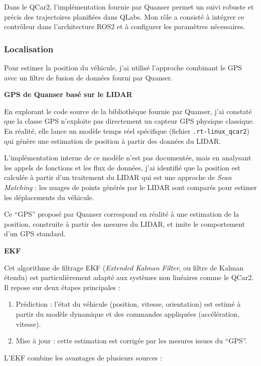 \documentclass{name}
\begin{document}
Dans le QCar2, l'implémentation fournie par Quanser permet un suivi robuste et précis des trajectoires planifiées dans QLabs. Mon rôle a consisté à intégrer ce contrôleur dans l'architecture ROS2 et à configurer les paramètres nécessaires.

\subsubsection*{Localisation}

Pour estimer la position du véhicule, j'ai utilisé l'approche combinant le GPS avec un filtre de fusion de données fourni par Quanser.

\textbf{GPS de Quanser basé sur le LIDAR}

En explorant le code source de la bibliothèque fournie par Quanser, j'ai constaté que la classe GPS n'exploite pas directement un capteur GPS physique classique. En réalité, elle lance un modèle temps réel spécifique (fichier \texttt{.rt-linux\_qcar2}) qui génère une estimation de position à partir des données du LIDAR.

L'implémentation interne de ce modèle n'est pas documentée, mais en analysant les appels de fonctions et les flux de données, j'ai identifié que la position est calculée à partir d'un traitement du LIDAR qui est une approche de \textit{Scan Matching} : les nuages de points générés par le LIDAR sont comparés pour estimer les déplacements du véhicule.

Ce “GPS” proposé par Quanser correspond en réalité à une estimation de la position, construite à partir des mesures du LIDAR, et imite le comportement d'un GPS standard.

\textbf{EKF}

Cet algorithme de filtrage EKF (\textit{Extended Kalman Filter}, ou filtre de Kalman étendu) est particulièrement adapté aux systèmes non linéaires comme le QCar2. Il repose sur deux étapes principales :

\begin{enumerate}
    \item Prédiction : l'état du véhicule (position, vitesse, orientation) est estimé à partir du modèle dynamique et des commandes appliquées (accélération, vitesse).
    \item Mise à jour : cette estimation est corrigée par les mesures issues du “GPS”.
\end{enumerate}

L'EKF combine les avantages de plusieurs sources :
\end{document}
